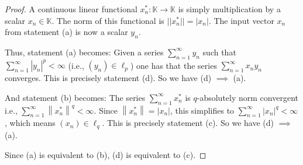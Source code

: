 \documentclass{article}
\newcommand{\norm}[1]{\left\|#1\right\|}
\begin{document}
\begin{proof}
A continuous linear functional $x_n^*: \mathbb{K} \to \mathbb{K}$ is simply multiplication by a scalar $x_n \in \mathbb{K}$. The norm of this functional is $||x_n^*|| = |x_n|$. The input vector $x_n$ from statement (a) is now a scalar $y_n$.

Thus, statement (a) becomes:
Given a series $\sum_{n=1}^{\infty} y_{n}$ such that $\sum_{n=1}^{\infty}|y_{n}|^{p}<\infty$ (i.e., $(y_n) \in \ell_p$) one has that the series $\sum_{n=1}^{\infty}x_{n}y_{n}$ converges.
This is precisely statement (d). So we have (d) $\implies$ (a).


And statement (b) becomes: 
The series $\sum_{n=1}^{\infty}x_{n}^{*}$ is $q$-absolutely norm convergent i.e., $\sum_{n=1}^{\infty}\norm{x_{n}^{*}}^{q}<\infty$.
Since $\norm{x_{n}^{*}} = |x_n|$, this simplifies to $\sum_{n=1}^{\infty}|x_{n}|^{q}<\infty$, which means $(x_n) \in \ell_q$.
This is precisely statement (c). So we have (d) $\implies$ (a).

Since (a) is equivalent to (b), (d) is equivalent to (c).
\end{proof}
\end{document}
